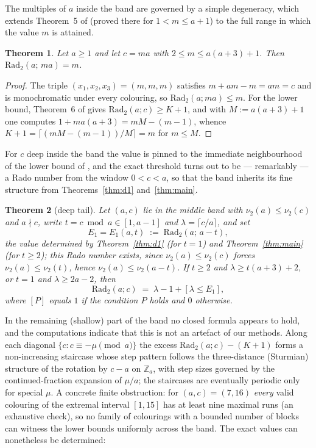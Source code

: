 \documentclass[11pt]{article}
\newtheorem{theorem}{Theorem}
\theoremstyle{remark}
\theoremstyle{definition}
\newcommand{\Rad}{\mathrm{Rad}_2}
\newcommand{\vtwo}{\nu_2}
\begin{document}
The multiples of $a$ inside the band are governed by a simple degeneracy,
which extends Theorem~5 of \cite{DT2020} (proved there for $1 < m \le a+1$)
to the full range in which the value $m$ is attained.

\begin{theorem}\label{thm:band-mult}
Let $a \ge 1$ and let $c = ma$ with $2 \le m \le a(a+3)+1$. Then
$\Rad(a;\,ma) = m$.
\end{theorem}

\begin{proof}
The triple $(x_1,x_2,x_3) = (m,m,m)$ satisfies $m + am - m = am = c$ and is
monochromatic under every colouring, so $\Rad(a;ma) \le m$. For the lower
bound, Theorem~6 of \cite{DT2020} gives $\Rad(a;c) \ge K+1$, and with
$M := a(a+3)+1$ one computes $1 + ma(a+3) = mM - (m-1)$, whence
$K + 1 = \lceil (mM - (m-1))/M \rceil = m$ for $m \le M$.
\end{proof}

For $c$ deep inside the band the value is pinned to the immediate
neighbourhood of the lower bound of \cite{DT2020}, and the exact threshold
turns out to be --- remarkably --- a Rado number from the window
$0 < c < a$, so that the band inherits its fine structure from
Theorems~\ref{thm:d1} and~\ref{thm:main}.

\begin{theorem}[deep tail]\label{thm:band-tail}
Let $(a,c)$ lie in the middle band with $\vtwo(a) \le \vtwo(c)$ and
$a \nmid c$, write $t = c \bmod a \in [1, a-1]$ and
$\lambda = \lceil c/a \rceil$, and set
\[
E_1 = E_1(a,t) \;:=\; \Rad(a;\,a-t),
\]
the value determined by Theorem~\ref{thm:d1} (for $t = 1$) and
Theorem~\ref{thm:main} (for $t \ge 2$); this Rado number exists, since
$\vtwo(a) \le \vtwo(c)$ forces $\vtwo(a) \le \vtwo(t)$, hence
$\vtwo(a) \le \vtwo(a-t)$. If $t \ge 2$ and
$\lambda \ge t(a+3)+2$, or $t = 1$ and $\lambda \ge 2a-2$, then
\[
\Rad(a;c) \;=\; \lambda - 1 + [\lambda \le E_1],
\]
where $[P]$ equals $1$ if the condition $P$ holds and $0$ otherwise.
\end{theorem}

In the remaining (shallow) part of the band no closed formula appears to
hold, and the computations indicate that this is not an artefact of our
methods. Along each diagonal
$\{c : c \equiv -\mu \pmod a\}$ the excess $\Rad(a;c) - (K+1)$ forms a
non-increasing staircase whose step pattern follows the three-distance
(Sturmian) structure of the rotation by $c - a$ on $\mathbb{Z}_a$, with
step sizes governed by the continued-fraction expansion of $\mu/a$; the
staircases are eventually periodic only for special $\mu$. A concrete
finite obstruction: for $(a,c) = (7,16)$ \emph{every} valid colouring of
the extremal interval $[1, 15]$ has at least nine maximal runs (an
exhaustive check), so no family of colourings with a bounded number of
blocks can witness the lower bounds uniformly across the band. The exact
values can nonetheless be determined:
\end{document}
